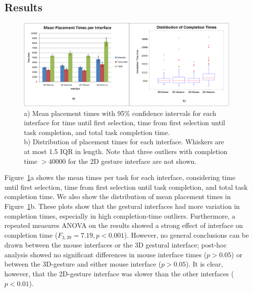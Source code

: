 \documentclass[pageno]{jpaper}
\begin{document}
\subsection{Results}
\begin{figure}
\centering
\includegraphics[width=0.99\textwidth]{figures/aggmean.png}
\caption{a) Mean placement times with 95\% confidence intervals for each interface for time until first
selection, time from first selection until task completion, and total task
completion time. \\
b) Distribution of placement times for each interface. Whiskers are
at most 1.5 IQR in length. Note that three outliers with completion time $> 40000$
for the 2D gesture interface are not shown.}
\label{fig:aggregate}
\end{figure}
Figure~\ref{fig:aggregate}a shows the mean times per task for each interface, considering time until first selection, time from first selection until
task completion, and total task completion time. We also show the distribution
of mean placement times in Figure~\ref{fig:aggregate}b. These plots show that the gestural interfaces had more variation in completion times, especially in high completion-time
outliers. Furthermore, a repeated measures ANOVA on the results showed a strong effect of
interface on completion time ($F_{3,39}=7.19, p < 0.001$).
However, no general conclusions can be drawn between the mouse interfaces or the 3D gestural interface; post-hoc analysis showed no significant differences
in mouse interface times ($p > 0.05$) or between the 3D-gesture and either mouse interface ($p > 0.05$). It is clear, however, that the 2D-gesture interface
was slower than the other interfaces ($p < 0.01$).
\end{document}
